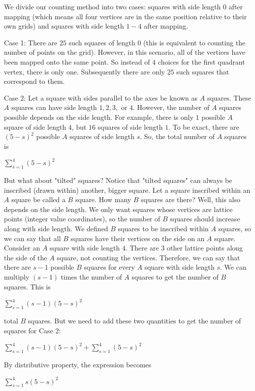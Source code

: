 \begin{enumerate}
 
We divide our counting method into two cases: squares with side length $0$ after mapping (which means all four vertices are in the same position relative to their own grids) and squares with side length $1-4$ after mapping.

 
Case 1: There are $25$ such squares of length $0$ (this is equivalent to counting the number of points on the grid). However, in this scenario, all of the vertices have been mapped onto the same point. So instead of $4$ choices for the first quadrant vertex, there is only one. Subsequently there are  only $25$ such squares that correspond to them.

 
Case 2: Let a square with sides parallel to the axes be known as $A$ squares. These $A$ squares can have side length $1, 2, 3,$ or $4$. However, the number of $A$ squares possible depends on the side length. For example, there is only $1$ possible $A$ square of side length $4$, but $16$ squares of side length $1$. To be exact, there are $(5-s)^2$ possible $A$ squares of side length $s$. So, the total number of $A$ squares is

 
$\sum_{s=1}^4 (5-s)^2$

 
But what about "tilted" squares? Notice that "tilted squares" can always be inscribed (drawn within) another, bigger square. Let a square inscribed within an $A$ square be called a $B$ square. How many $B$ squares are there? Well, this also depends on the side length. We only want squares whose vertices are lattice points (integer value coordinates), so the number of $B$ squares should increase along with side length. We defined $B$ squares to be inscribed within $A$ squares, so we can say that all $B$ squares have their vertices on the side on an $A$ square. Consider an $A$ square with side length $4$. There are $3$ other lattice points along the side of the $A$ square, not counting the vertices. Therefore, we can say that there are $s-1$ possible $B$ squares for every $A$ square with side length $s$. We can multiply $(s-1)$ times the number of $A$ squares to get the number of $B$ squares. This is 

 
$\sum_{s=1}^4 (s-1)(5-s)^2$

 
total $B$ squares. But we need to add these two quantities to get the number of squares for Case 2:

 
$\sum_{s=1}^4 (s-1)(5-s)^2 + \sum_{s=1}^4 (5-s)^2$

 
By distributive property, the expression becomes

 
$\sum_{s=1}^4 s(5-s)^2$


\end{enumerate}
